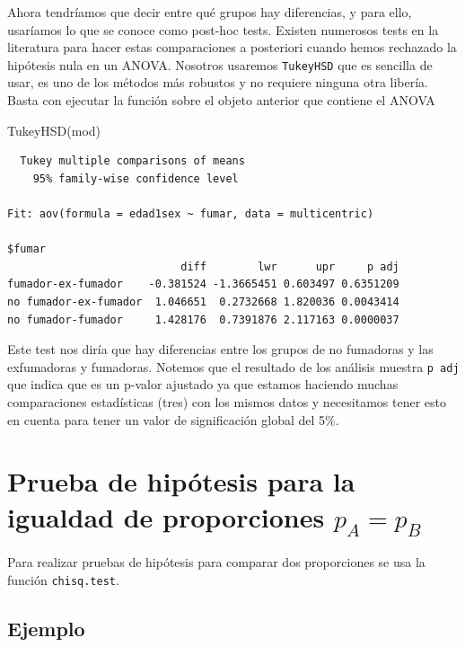 \documentclass[
]{book}
\newenvironment{Shaded}{\begin{snugshade}}{\end{snugshade}}
\newcommand{\FunctionTok}[1]{\textcolor[rgb]{0.00,0.00,0.00}{#1}}
\newcommand{\NormalTok}[1]{#1}
\begin{document}
Ahora tendríamos que decir entre qué grupos hay diferencias, y para ello, usaríamos lo que se conoce como post-hoc tests. Existen numerosos tests en la literatura para hacer estas comparaciones a posteriori cuando hemos rechazado la hipótesis nula en un ANOVA. Nosotros usaremos \texttt{TukeyHSD} que es sencilla de usar, es uno de los métodos más robustos y no requiere ninguna otra libería. Basta con ejecutar la función sobre el objeto anterior que contiene el ANOVA

\begin{Shaded}
\begin{Highlighting}[]
\FunctionTok{TukeyHSD}\NormalTok{(mod)}
\end{Highlighting}
\end{Shaded}

\begin{verbatim}
  Tukey multiple comparisons of means
    95% family-wise confidence level

Fit: aov(formula = edad1sex ~ fumar, data = multicentric)

$fumar
                           diff        lwr      upr     p adj
fumador-ex-fumador    -0.381524 -1.3665451 0.603497 0.6351209
no fumador-ex-fumador  1.046651  0.2732668 1.820036 0.0043414
no fumador-fumador     1.428176  0.7391876 2.117163 0.0000037
\end{verbatim}

Este test nos diría que hay diferencias entre los grupos de no fumadoras y las exfumadoras y fumadoras. Notemos que el resultado de los análisis muestra \texttt{p\ adj} que indica que es un p-valor ajustado ya que estamos haciendo muchas comparaciones estadísticas (tres) con los mismos datos y necesitamos tener esto en cuenta para tener un valor de significación global del 5\%.

\hypertarget{prueba-de-hipuxf3tesis-para-la-igualdad-de-proporciones-p_a-p_b}{%
\section{\texorpdfstring{Prueba de hipótesis para la igualdad de proporciones \(p_A = p_B\)}{Prueba de hipótesis para la igualdad de proporciones p\_A = p\_B}}\label{prueba-de-hipuxf3tesis-para-la-igualdad-de-proporciones-p_a-p_b}}

Para realizar pruebas de hipótesis para comparar dos proporciones se usa la función \texttt{chisq.test}.

\hypertarget{ejemplo-5}{%
\subsection*{Ejemplo}\label{ejemplo-5}}
\end{document}
